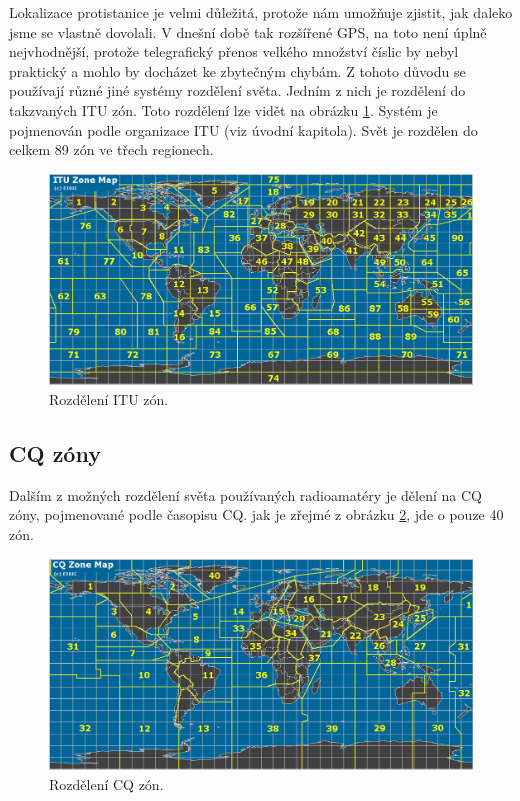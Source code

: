 Lokalizace protistanice je velmi důležitá, protože nám umožňuje zjistit, jak
daleko jsme se vlastně dovolali. V dnešní době tak rozšířené GPS, na toto není
úplně nejvhodnější, protože telegrafický přenos velkého množství číslic
by nebyl praktický a mohlo by docházet ke zbytečným chybám. Z tohoto důvodu se
používají různé jiné systémy rozdělení světa. Jedním z nich je rozdělení do takzvaných ITU zón.
Toto rozdělení lze vidět na obrázku \ref{fig:itu_zony}.
Systém je pojmenován podle organizace ITU (viz úvodní kapitola). Svět je rozdělen do celkem 
89 zón ve třech regionech.

\begin{figure}[h]
\centering
\includegraphics[trim=0cm 0cm 0cm 0cm, scale=0.4]{fig/itu-zone}
\caption{Rozdělení ITU zón.}
\label{fig:itu_zony}
\end{figure}

\subsection{CQ zóny}

Dalším z možných rozdělení světa používaných radioamatéry je dělení na CQ zóny, pojmenované podle časopisu CQ.
jak je zřejmé z obrázku \ref{fig:cq_zony}, jde o pouze 40 zón.

\begin{figure}[h]
\centering
\includegraphics[trim=0cm 0cm 0cm 0cm, scale=0.4]{fig/cq-zone}
\caption{Rozdělení CQ zón.}
\label{fig:cq_zony}
\end{figure}

